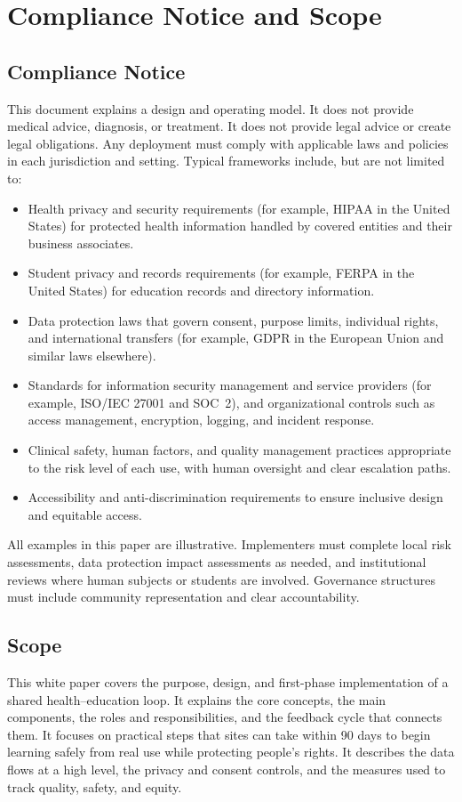 \documentclass[12pt]{article}
\begin{document}
\section*{Compliance Notice and Scope}
\subsection*{Compliance Notice}
This document explains a design and operating model. It does not provide medical advice, diagnosis, or treatment. It does not provide legal advice or create legal obligations. Any deployment must comply with applicable laws and policies in each jurisdiction and setting. Typical frameworks include, but are not limited to:
\begin{itemize}[leftmargin=*]
  \item Health privacy and security requirements (for example, HIPAA in the United States) for protected health information handled by covered entities and their business associates.
  \item Student privacy and records requirements (for example, FERPA in the United States) for education records and directory information.
  \item Data protection laws that govern consent, purpose limits, individual rights, and international transfers (for example, GDPR in the European Union and similar laws elsewhere).
  \item Standards for information security management and service providers (for example, ISO/IEC 27001 and SOC~2), and organizational controls such as access management, encryption, logging, and incident response.
  \item Clinical safety, human factors, and quality management practices appropriate to the risk level of each use, with human oversight and clear escalation paths.
  \item Accessibility and anti-discrimination requirements to ensure inclusive design and equitable access.
\end{itemize}
All examples in this paper are illustrative. Implementers must complete local risk assessments, data protection impact assessments as needed, and institutional reviews where human subjects or students are involved. Governance structures must include community representation and clear accountability.

\subsection*{Scope}
This white paper covers the purpose, design, and first-phase implementation of a shared health–education loop. It explains the core concepts, the main components, the roles and responsibilities, and the feedback cycle that connects them. It focuses on practical steps that sites can take within 90 days to begin learning safely from real use while protecting people’s rights. It describes the data flows at a high level, the privacy and consent controls, and the measures used to track quality, safety, and equity.
\end{document}
